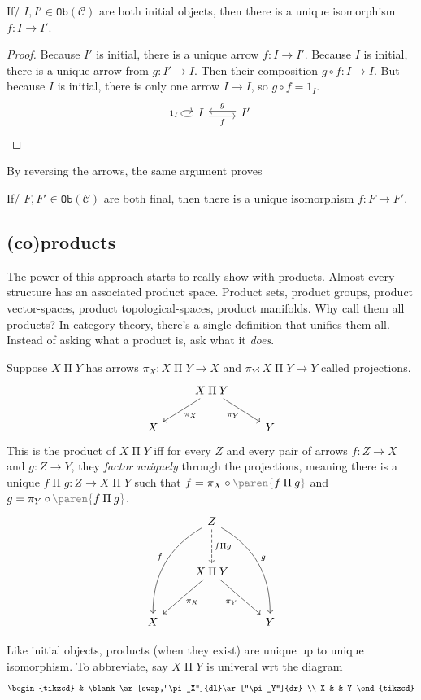 \documentclass[a5paper]{scrartcl}
\def\cat{\mathcal{C}}
\newcommand{\PI}{\mathbin{\Pi}}
\newcommand{\obj}{\texttt{Ob}}
\newcommand{\gray}[1]{{\color{gray}#1}}
\newcommand{\black}[1]{{\color{black}#1}}
\newcommand{\gparen}[1]{\left .\!{\gray{\paren{\black{#1}}}}\!\right.}
\newcommand{\marginnote}[1]{\normalmarginpar\marginpar{\tiny\sffamily\raggedright #1}}
\begin{document}
\begin{theorem}
  If\eit/ \(I,I'\in\obj(\cat)\) are both initial objects, then there is a unique isomorphism \(f: I \to I'\).
\end{theorem}
\begin{proof}
  Because \(I'\) is initial, there is a unique arrow \(f: I \to I'\). Because \(I\) is initial, there is a unique arrow from \(g:I'\to I\). Then their composition \(g\circ f : I \to I\). But because \(I\) is initial, there is only one arrow \(I\to I\), so \(g\circ f = 1_I\).
  \[
    \begin{tikzcd}
      I \rar[swap,shift right=.5ex]{f}\arrow[loop left,"1_I"]& I' \lar[swap,shift right = .5ex]{g}
    \end{tikzcd}
  \]
\end{proof}
By reversing the arrows, the same argument proves
\begin{theorem}
  If\eit/ \(F,F'\in\obj(\cat)\) are both final, then there is a unique isomorphism \(f:F\to F'\).
\end{theorem}
\subsection{(co)products}
The power of this approach starts to really show with products. Almost every structure has an associated product space. Product sets, product groups, product vector-spaces, product topological-spaces, product manifolds. Why call them all products? In category theory, there's a single definition that unifies them all\marginnote{and, in the darkness, bind them}. Instead of asking what a product is, ask what it \emph{does}.
\begin{defn}[product]
  Suppose \(X\PI Y\) has arrows \(\pi_X:X\PI Y \to X\) and \(\pi_Y: X\PI Y \to Y\) called projections.
  \[
    \begin{tikzcd}
      &X \PI Y\ar["\pi_X"]{dl} \ar["\pi_Y",swap]{dr} \\
      X && Y
    \end{tikzcd}
  \]
  This is the product of \(X\PI Y\) iff for every \(Z\) and every pair of arrows \(f: Z \to X \) and \(g: Z \to Y\), they \emph{factor uniquely} through the projections, meaning there is a unique \(f\PI g: Z \to X\PI Y\) such that \(f = \pi_X \circ \gparen{f\PI g}\) and \(g=\pi_Y \circ \gparen{f\PI g}\).
  \[
    \begin{tikzcd}[row sep=3em]
      &Z\ar[swap,bend right=3em,"f"]{ddl} \ar[bend left=3em,"g"]{ddr}\dar[dashed]{f\PI g}\\
     & X\PI Y \ar["{\pi_X}"]{dl} \ar[swap,"\pi_Y"]{dr} \\
     X&  & Y
    \end{tikzcd}
  \]
\end{defn}
Like initial objects,  products (when they exist) are unique up to unique isomorphism. To abbreviate, say \(X \PI Y\) is univeral wrt the diagram
\[
  \begin{tikzcd}
    & \blank\ar[swap,"\pi_X"]{dl}\ar["\pi_Y"]{dr}  \\
    X & & Y
  \end{tikzcd}
\]
\end{document}
